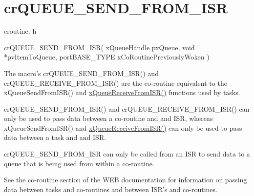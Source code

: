 \hypertarget{group__cr_q_u_e_u_e___s_e_n_d___f_r_o_m___i_s_r}{\section{cr\-Q\-U\-E\-U\-E\-\_\-\-S\-E\-N\-D\-\_\-\-F\-R\-O\-M\-\_\-\-I\-S\-R}
\label{group__cr_q_u_e_u_e___s_e_n_d___f_r_o_m___i_s_r}
}
croutine. h 
\begin{DoxyPre}
  crQUEUE\_SEND\_FROM\_ISR(
                            xQueueHandle pxQueue,
                            void *pvItemToQueue,
                            portBASE\_TYPE xCoRoutinePreviouslyWoken
                       )\end{DoxyPre}


The macro's cr\-Q\-U\-E\-U\-E\-\_\-\-S\-E\-N\-D\-\_\-\-F\-R\-O\-M\-\_\-\-I\-S\-R() and cr\-Q\-U\-E\-U\-E\-\_\-\-R\-E\-C\-E\-I\-V\-E\-\_\-\-F\-R\-O\-M\-\_\-\-I\-S\-R() are the co-\/routine equivalent to the x\-Queue\-Send\-From\-I\-S\-R() and \hyperlink{_common_2_libraries_2_free_r_t_o_s_2_source_2include_2queue_8h_a1e861f8eb3f7f56d10fc626fd76ca3a9}{x\-Queue\-Receive\-From\-I\-S\-R()} functions used by tasks.

cr\-Q\-U\-E\-U\-E\-\_\-\-S\-E\-N\-D\-\_\-\-F\-R\-O\-M\-\_\-\-I\-S\-R() and cr\-Q\-U\-E\-U\-E\-\_\-\-R\-E\-C\-E\-I\-V\-E\-\_\-\-F\-R\-O\-M\-\_\-\-I\-S\-R() can only be used to pass data between a co-\/routine and and I\-S\-R, whereas x\-Queue\-Send\-From\-I\-S\-R() and \hyperlink{_common_2_libraries_2_free_r_t_o_s_2_source_2include_2queue_8h_a1e861f8eb3f7f56d10fc626fd76ca3a9}{x\-Queue\-Receive\-From\-I\-S\-R()} can only be used to pass data between a task and and I\-S\-R.

cr\-Q\-U\-E\-U\-E\-\_\-\-S\-E\-N\-D\-\_\-\-F\-R\-O\-M\-\_\-\-I\-S\-R can only be called from an I\-S\-R to send data to a queue that is being used from within a co-\/routine.

See the co-\/routine section of the W\-E\-B documentation for information on passing data between tasks and co-\/routines and between I\-S\-R's and co-\/routines.


